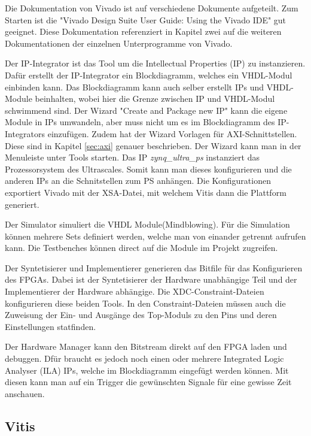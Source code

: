 \documentclass{article}
\begin{document}
Die Dokumentation von Vivado ist auf verschiedene Dokumente aufgeteilt. Zum Starten ist die "Vivado Design Suite User Guide: Using the Vivado IDE" gut geeignet. Diese Dokumentation referenziert in Kapitel zwei auf die weiteren Dokumentationen der einzelnen Unterprogramme von Vivado. 

Der IP-Integrator ist das Tool um die Intellectual Properties (IP) zu instanzieren. Dafür erstellt der IP-Integrator ein Blockdiagramm, welches ein VHDL-Modul einbinden kann. Das Blockdiagramm kann auch selber erstellt IPs und VHDL-Module beinhalten, wobei hier die Grenze zwischen IP und VHDL-Modul schwimmend sind. Der Wizard "Create and Package new IP" kann die eigene Module in IPs umwandeln, aber muss nicht um es im Blockdiagramm des IP-Integrators einzufügen. Zudem hat der Wizard Vorlagen für AXI-Schnittstellen. Diese sind in Kapitel \ref{sec:axi} genauer beschrieben. Der Wizard kann man in der Menuleiste unter Tools starten. Das IP \textit{zynq\_ultra\_ps} instanziert das Prozessorsystem des Ultrascales. Somit kann man dieses konfigurieren und die anderen IPs an die Schnitstellen zum PS anhängen. Die Konfigurationen exportiert Vivado mit der XSA-Datei, mit welchem Vitis dann die Plattform generiert. 

Der Simulator simuliert die VHDL Module(Mindblowing). Für die Simulation können mehrere Sets definiert werden, welche man von einander getrennt aufrufen kann. Die Testbenches können direct auf die Module im Projekt zugreifen.  

Der Syntetisierer und Implementierer generieren das Bitfile für das Konfigurieren des FPGAs. Dabei ist der Syntetisierer der Hardware unabhängige Teil und der Implementierer der Hardware abhängige. Die XDC-Constraint-Dateien konfigurieren diese beiden Tools. In den Constraint-Dateien müssen auch die Zuweisung der Ein- und Ausgänge des Top-Moduls zu den Pins und deren Einstellungen statfinden. 

Der Hardware Manager kann den Bitstream direkt auf den FPGA laden und debuggen. Dfür braucht es jedoch noch einen oder mehrere Integrated Logic Analyser (ILA) IPs, welche im Blockdiagramm eingefügt werden können. Mit diesen kann man auf ein Trigger die gewünschten Signale für eine gewisse Zeit anschauen. 

\subsection{Vitis}
\end{document}
